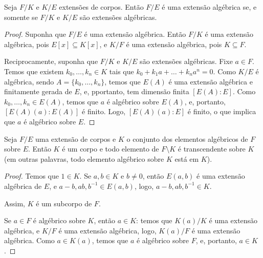 \begin{prop}
    Seja $F/K$ e $K/E$ extensões de corpos. Então $F/E$ é uma extensão algébrica se, e somente se $F/K$ e $K/E$ são extensões algébricas.
\end{prop}
\begin{proof}
    Suponha que $F/E$ é uma extensão algébrica. Então $F/K$ é uma extensão algébrica, pois $E[x]\subseteq K[x]$, e $K/F$ é uma extensão algébrica, pois $K\subseteq F$.

    Reciprocamente, suponha que $F/K$ e $K/E$ são extensões algébricas. Fixe $a \in F$.
    Temos que existem $k_0, \dots, k_n \in K$ tais que $k_0+k_1a+\dots+k_na^n=0$. Como $K/E$ é algébrica, sendo $A=\{k_0, \dots, k_n\}$, temos que $E(A)$ é uma extensão algébrica e finitamente gerada de $E$, e, pportanto, tem dimensão finita $[E(A):E]$. Como $k_0, \dots, k_n \in E(A)$, temos que $a$ é algébrico sobre $E(A)$, e, portanto, $[E(A)(a):E(A)]$ é finito. Logo, $[E(A)(a):E]$ é finito, o que implica que $a$ é algébrico sobre $E$.
\end{proof}

\begin{prop}
    Seja $F/E$ uma extensão de corpos e $K$ o conjunto dos elementos algébricos de $F$ sobre $E$. Então $K$ é um corpo e todo elemento de $F\setminus K$ é transcendente sobre $K$ (em outras palavras, todo elemento algébrico sobre $K$ está em $K$).
\end{prop}

\begin{proof}
    Temos que $1 \in K$.
    Se $a, b \in K$ e $b \neq 0$, então $E(a, b)$ é uma extensão algébrica de $E$, e $a-b, ab, b^{-1} \in E(a, b)$, logo, $a-b, ab, b^{-1}\in K$.

    Assim, $K$ é um subcorpo de $F$.

    Se $a \in F$ é algébrico sobre $K$, então $a \in K$: temos que $K(a)/K$ é uma extensão algébrica, e $K/F$ é uma extensão algébrica, logo, $K(a)/F$ é uma extensão algébrica. Como $a \in K(a)$, temos que $a$ é algébrico sobre $F$, e, portanto, $a \in K$.
\end{proof}

